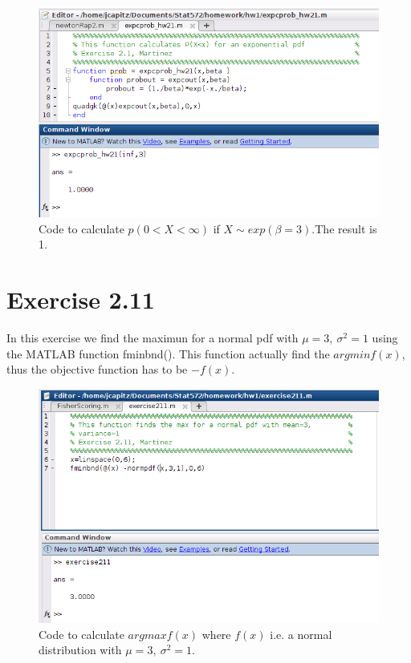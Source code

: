 \documentclass[12pt,a4paper]{article}
\begin{document}
\begin{figure}[ht!]
\includegraphics[scale=.70]{excersie22.png}
\caption{Code to calculate $p(0<X<\infty)$ if $X\sim exp(\beta=3)$.The result is 1.}
\label{fig1:2.2}
\end{figure}

\FloatBarrier

\section*{Exercise 2.11}

In this exercise we find the maximun for a normal pdf with $\mu=3, \ \sigma^2=1$ using the MATLAB function fminbnd(). This function actually find the $argmin f(x)$, thus the objective function has to be $-f(x)$. 

\begin{figure}[ht!]
\includegraphics[scale=.70]{results211.png}
\caption{Code to calculate $argmax f(x)$ where $f(x)$ i.e. a normal distribution with $\mu=3,\ \sigma^2=1$.}
\label{fig1:2.11}
\end{figure}
\end{document}
